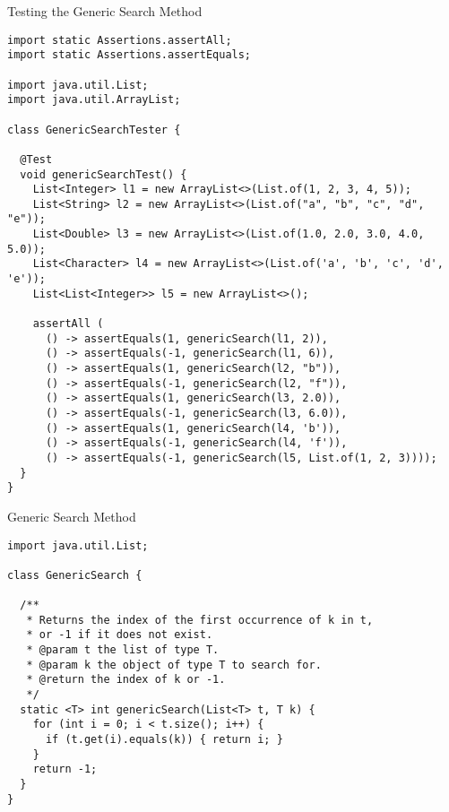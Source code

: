
\begin{cl}[]{Testing the Generic Search Method}
\begin{lstlisting}[language=MyJava]
import static Assertions.assertAll;
import static Assertions.assertEquals;

import java.util.List;
import java.util.ArrayList;

class GenericSearchTester {

  @Test 
  void genericSearchTest() {
    List<Integer> l1 = new ArrayList<>(List.of(1, 2, 3, 4, 5));
    List<String> l2 = new ArrayList<>(List.of("a", "b", "c", "d", "e"));
    List<Double> l3 = new ArrayList<>(List.of(1.0, 2.0, 3.0, 4.0, 5.0));
    List<Character> l4 = new ArrayList<>(List.of('a', 'b', 'c', 'd', 'e'));
    List<List<Integer>> l5 = new ArrayList<>();

    assertAll (
      () -> assertEquals(1, genericSearch(l1, 2)),
      () -> assertEquals(-1, genericSearch(l1, 6)),
      () -> assertEquals(1, genericSearch(l2, "b")),
      () -> assertEquals(-1, genericSearch(l2, "f")),
      () -> assertEquals(1, genericSearch(l3, 2.0)),
      () -> assertEquals(-1, genericSearch(l3, 6.0)),
      () -> assertEquals(1, genericSearch(l4, 'b')),
      () -> assertEquals(-1, genericSearch(l4, 'f')),
      () -> assertEquals(-1, genericSearch(l5, List.of(1, 2, 3))));
  }
}
\end{lstlisting}
\end{cl}

\begin{cl}[]{Generic Search Method}
\begin{lstlisting}[language=MyJava]
import java.util.List;

class GenericSearch {

  /**
   * Returns the index of the first occurrence of k in t, 
   * or -1 if it does not exist.
   * @param t the list of type T.
   * @param k the object of type T to search for.
   * @return the index of k or -1.
   */
  static <T> int genericSearch(List<T> t, T k) {
    for (int i = 0; i < t.size(); i++) {
      if (t.get(i).equals(k)) { return i; }
    }
    return -1;
  }
}
\end{lstlisting}
\end{cl}

